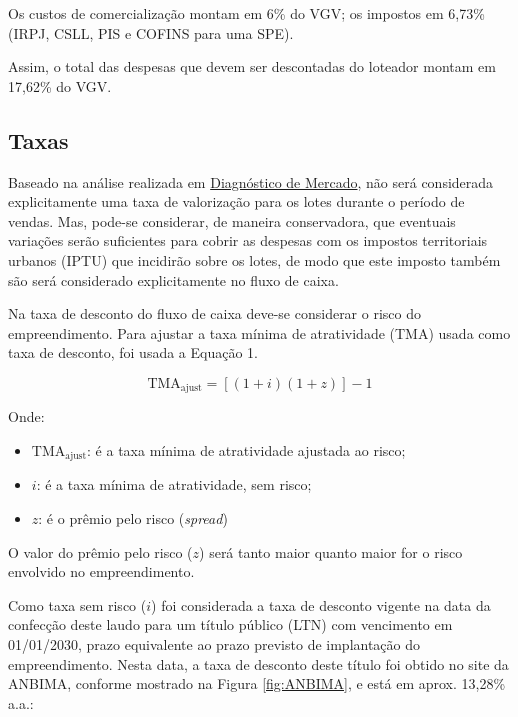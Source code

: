 \documentclass[
  10pt,
  a4paper]{article}
\providecommand{\tightlist}{%
  \setlength{\itemsep}{0pt}\setlength{\parskip}{0pt}}
\begin{document}
Os custos de comercialização montam em 6\% do VGV; os impostos em 6,73\%
(IRPJ, CSLL, PIS e COFINS para uma SPE).

Assim, o total das despesas que devem ser descontadas do loteador montam
em 17,62\% do VGV.

\subsection{Taxas}\label{taxas}

Baseado na análise realizada em
\hyperref[diagnuxf3stico-de-mercado]{Diagnóstico de Mercado}, não será
considerada explicitamente uma taxa de valorização para os lotes durante
o período de vendas. Mas, pode-se considerar, de maneira conservadora,
que eventuais variações serão suficientes para cobrir as despesas com os
impostos territoriais urbanos (IPTU) que incidirão sobre os lotes, de
modo que este imposto também são será considerado explicitamente no
fluxo de caixa.

Na taxa de desconto do fluxo de caixa deve-se considerar o risco do
empreendimento. Para ajustar a taxa mínima de atratividade (TMA) usada
como taxa de desconto, foi usada a Equação 1.

\begin{equation}
\text{TMA}_{\text{ajust}} = [(1+i)(1+z)]-1
\end{equation}

Onde:

\begin{itemize}
\tightlist
\item
  \(\text{TMA}_{\text{ajust}}\): é a taxa mínima de atratividade
  ajustada ao risco;
\item
  \(i\): é a taxa mínima de atratividade, sem risco;
\item
  \(z\): é o prêmio pelo risco (\emph{spread})
\end{itemize}

O valor do prêmio pelo risco (\(z\)) será tanto maior quanto maior for o
risco envolvido no empreendimento.

Como taxa sem risco (\(i\)) foi considerada a taxa de desconto vigente
na data da confecção deste laudo para um título público (LTN) com
vencimento em 01/01/2030, prazo equivalente ao prazo previsto de
implantação do empreendimento. Nesta data, a taxa de desconto deste
título foi obtido no site da ANBIMA, conforme mostrado na Figura
\ref{fig:ANBIMA}, e está em aprox. 13,28\% a.a.:
\end{document}
